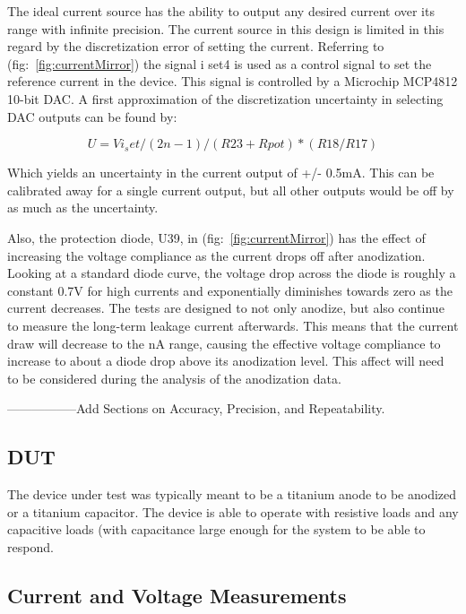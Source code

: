 \documentclass[journal]{IEEEtran}
\begin{document}
The ideal current source has the ability to output any desired current over its range with infinite precision. The current source in this design is limited in this regard by the discretization error of setting the current. Referring to (fig:~\ref{fig:currentMirror}) the signal i set4 is used as a control signal to set the reference current in the device. This signal is controlled by a Microchip MCP4812 10-bit DAC. A first approximation of the discretization uncertainty in selecting DAC outputs can be found by:


\begin{equation}
U = Vi_set /(2n-1) / (R23 + Rpot) *(R18/R17)
\end{equation}

Which yields an uncertainty in the current output of +/- 0.5mA. This can be calibrated away for a single current output, but all other outputs would be off by as much as the uncertainty.

Also, the protection diode, U39, in (fig:~\ref{fig:currentMirror}) has the effect of increasing the voltage compliance as the current drops off after anodization. Looking at a standard diode curve, the voltage drop across the diode is roughly a constant 0.7V for high currents and exponentially diminishes towards zero as the current decreases. The tests are designed to not only anodize, but also continue to measure the long-term leakage current afterwards. This means that the current draw will decrease to the nA range, causing the effective voltage compliance to increase to about a diode drop above its anodization level. This affect will need to be considered during the analysis of the anodization data.

-----------------Add Sections on Accuracy, Precision, and Repeatability. 

\subsection{DUT}

The device under test was typically meant to be a titanium anode to be anodized or a titanium capacitor. The device is able to operate with resistive loads and any capacitive loads (with capacitance large enough for the system to be able to respond.


\subsection{Current and Voltage Measurements}
\end{document}
